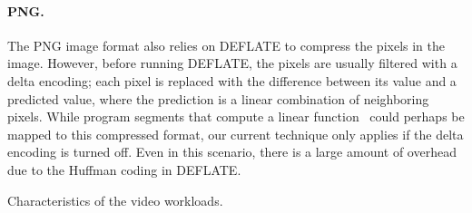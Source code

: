 \paragraph{PNG.}
The PNG image format also relies on DEFLATE to compress the pixels in
the image.  However, before running DEFLATE, the pixels are usually
filtered with a delta encoding; each pixel is replaced with the
difference between its value and a predicted value, where the
prediction is a linear combination of neighboring pixels.  While
program segments that compute a linear function~\cite{aalamb} could
perhaps be mapped to this compressed format, our current technique
only applies if the delta encoding is turned off.  Even in this
scenario, there is a large amount of overhead due to the Huffman
coding in DEFLATE.

\begin{table*}[t]
\vspace{-1\baselineskip}
\caption{Characteristics of the video workloads.
\protect\label{tab:videos}}
\end{table*}

